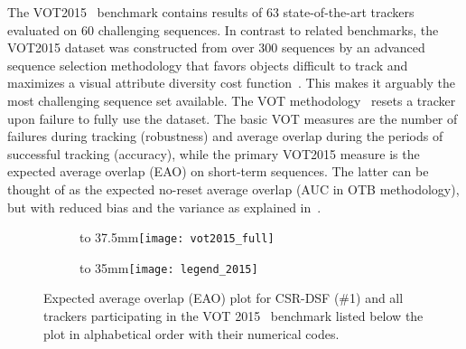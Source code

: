 \documentclass[twocolumn]{article}
\def\imagebox#1#2{\vtop to #1{\null\hbox{#2}\vfill}}
\begin{document}
The VOT2015~\citep{kristan_vot2015} benchmark contains results of 
63 state-of-the-art trackers evaluated on 60 challenging sequences.
In contrast to related benchmarks, the VOT2015 dataset was constructed from over 300 sequences by an advanced sequence selection methodology that favors objects difficult to track and maximizes a visual attribute diversity cost function~\citep{kristan_vot2015}. This makes it arguably the most challenging sequence set available.  The VOT methodology~\citep{kristan_vot_tpami2016} resets a tracker upon failure to fully use the dataset. The basic VOT measures are the number of failures during tracking (robustness) and average overlap during the periods of successful tracking (accuracy), while the primary VOT2015 measure is the expected average overlap (EAO) on short-term sequences. The latter can be thought of as the expected no-reset average overlap (AUC in OTB methodology), but with reduced bias and the variance as explained in~\citep{kristan_vot2015}.

\begin{figure}[!t]
	\captionsetup[subfigure]{justification=justified,singlelinecheck=false}
    \centering
    \begin{subfigure}[t]{\linewidth}\centering
        \imagebox{37.5mm}{\texttt{[image: vot2015\_full]}}
    \end{subfigure}\vspace{\fill}
    \begin{subfigure}[t]{\linewidth}\centering
        \imagebox{35mm}{\texttt{[image: legend\_2015]}}
    \end{subfigure}
    \caption{Expected average overlap (EAO) plot for CSR-DSF (\#1) and all trackers participating in the VOT 2015~\citep{kristan_vot2015} benchmark listed below the plot in alphabetical order with their numerical codes.}
    \label{fig:vot15_graph}
\end{figure}
\end{document}
